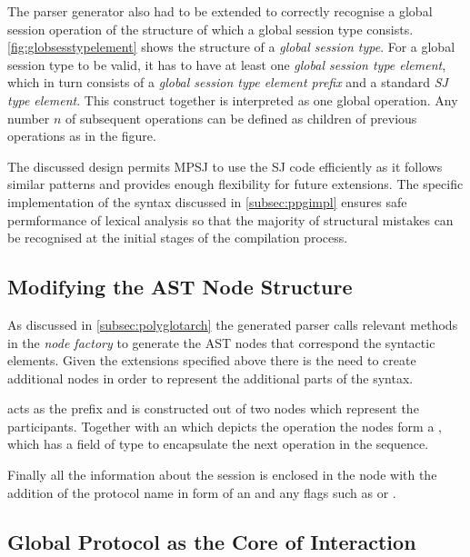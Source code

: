 The parser generator also had to be extended to correctly recognise a global session operation of the structure  of which a global session type consists. \autoref{fig:globsesstypelement} shows the structure of a \textit{global session type}. For a global session type to be valid, it has to have at least one \textit{global session type element}, which in turn consists of a \textit{global session type element prefix} and a standard \textit{SJ type element}. This construct together is interpreted as one global operation. Any number $n$ of subsequent operations can be defined as children of previous operations as in the figure. 

The discussed design permits MPSJ to use the SJ code efficiently as it follows similar patterns and provides enough flexibility for future extensions. The specific implementation of the syntax discussed in \autoref{subsec:ppgimpl} ensures safe permformance of lexical analysis so that the majority of structural mistakes can be recognised at the initial stages of the compilation process.


\subsection{Modifying the AST Node Structure}

As discussed in \autoref{subsec:polyglotarch} the generated parser calls relevant methods in the \textit{node factory} to generate the AST nodes that correspond the syntactic elements. Given the extensions specified above there is the need to create additional nodes in order to represent the additional parts of the syntax.

 acts as the prefix and is constructed out of two  nodes which represent the participants. Together with an  which depicts the operation the nodes form a , which has a field  of type  to encapsulate the next operation in the sequence.

Finally all the information about the session is enclosed in the  node with the addition of the protocol name in form of an  and any flags such as  or . 

\subsection{Global Protocol as the Core of Interaction}

